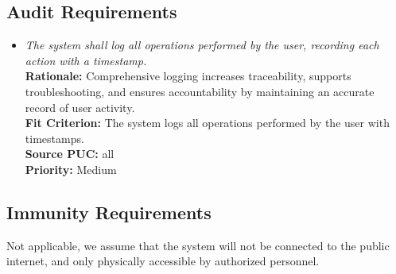 \documentclass[12pt]{article}
\begin{document}
\subsection{Audit Requirements}
\begin{itemize}[leftmargin=*]
  \item[AUR-1] \emph{The system shall log all operations performed by the user,
          recording each action with a timestamp.}\\[2mm]
        \textbf{Rationale:} Comprehensive logging increases traceability, supports troubleshooting, and ensures accountability by maintaining an accurate record of user activity.\\
        \textbf{Fit Criterion:} The system logs all operations performed by the user with timestamps.\\
        \textbf{Source PUC:} all \\
        \textbf{Priority:} Medium
\end{itemize}

\subsection{Immunity Requirements}

Not applicable, we assume that the system will not be connected to the public
internet, and only physically accessible by authorized personnel.
\end{document}
